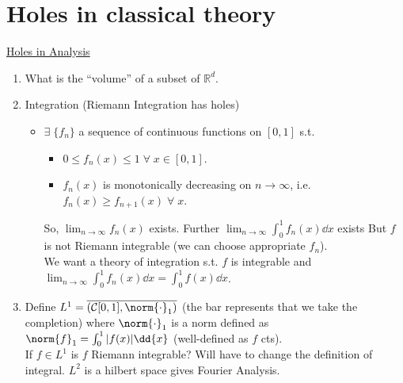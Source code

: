 
\def\npart {II}
\def\nterm {Michaelmas}
\def\nyear {2023}
\def\nlecturer {Dr Sarkar}
\def\ncourse {Probability and Measure}



% 

\setcounter{section}{-1}


    \maketitle
    \tableofcontents

    \section{Holes in classical theory}

    \underline{Holes in Analysis}

    \begin{enumerate}
        \item What is the ``volume'' of a subset of $\mathbb{R}^d$.
        \item Integration (Riemann Integration has holes)
        \begin{itemize}
            \item $\exists \; \{f_n\}$ a sequence of continuous functions on $[0, 1]$ s.t.
            \begin{itemize}
                \item $0 \leq f_n(x) \leq 1 \; \forall \; x \in [0, 1]$.
                \item $f_n(x)$ is monotonically decreasing on $n \to \infty$, i.e. $f_n(x) \geq f_{n+1}(x) \; \forall \; x$.
            \end{itemize}
            So, $\lim_{n \to \infty} f_n(x)$ exists.
            Further $\lim_{n \to \infty} \int_{0}^{1} f_n(x) \dd{x}$ exists
            But $f$ is not Riemann integrable (we can choose appropriate $f_n$). \\
            We want a theory of integration s.t. $f$ is integrable and $\lim_{n \to \infty} \int_{0}^{1} f_n(x) \dd{x} = \int_{0}^{1} f(x) \dd{x}$.
        \end{itemize}
        \item Define $L^1 = \overline{(\mathcal{C}[0, 1], \norm{\cdot}_1)}$ (the bar represents that we take the completion) where $\norm{\cdot}_1$ is a norm defined as $\norm{f}_1  = \int_0^1 |f(x)| \dd{x}$ (well-defined as $f$ cts). \\
        If $f \in L^1$ is $f$ Riemann integrable? Will have to change the definition of integral.
        $L^2$ is a hilbert space gives Fourier Analysis.
    \end{enumerate}

